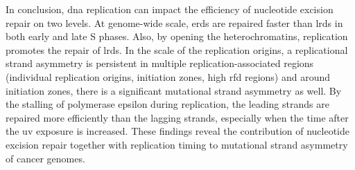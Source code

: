 In conclusion, \gls{dna} replication can impact the efficiency of nucleotide excision repair on two levels. At genome-wide scale, \gls{erd}s are repaired faster than \gls{lrd}s in both early and late S phases. Also, by opening the heterochromatins, replication promotes the repair of \gls{lrd}s. In the scale of the replication origins, a replicational strand asymmetry is persistent in multiple replication-associated regions (individual replication origins, initiation zones, high \gls{rfd} regions) and around initiation zones, there is a significant mutational strand asymmetry as well. By the stalling of polymerase \gls{epsilon} during replication, the leading strands are repaired more efficiently than the lagging strands, especially when the time after the \gls{uv} exposure is increased. These findings reveal the contribution of nucleotide excision repair together with replication timing to mutational strand asymmetry of cancer genomes.


